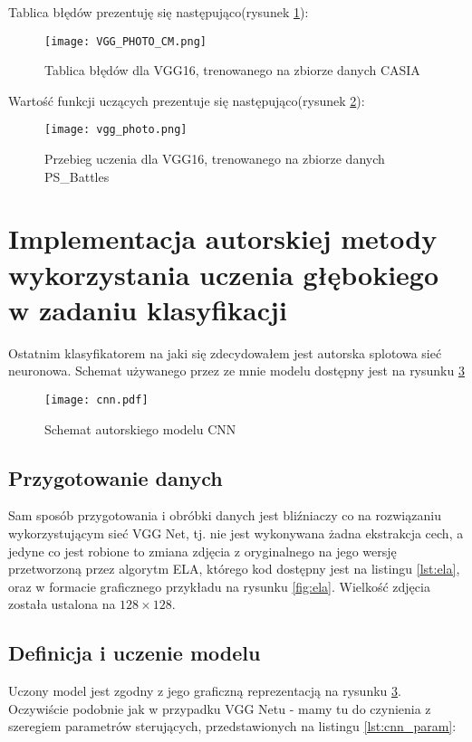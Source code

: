 Tablica błędów prezentuję się następująco(rysunek \ref{fig:vgg_cm_ps}):

\begin{figure}[H]
	\texttt{[image: VGG\_PHOTO\_CM.png]}
	\centering
	\caption{Tablica błędów dla VGG16, trenowanego na zbiorze danych CASIA}
	\label{fig:vgg_cm_ps}
\end{figure}

Wartość funkcji uczących prezentuje się następująco(rysunek \ref{fig:vgg_learn_photo}):

\begin{figure}[H]
	\texttt{[image: vgg\_photo.png]}
	\centering
	\caption{Przebieg uczenia dla VGG16, trenowanego na zbiorze danych PS\_Battles}
	\label{fig:vgg_learn_photo}
\end{figure}

\section{Implementacja autorskiej metody wykorzystania uczenia głębokiego w zadaniu klasyfikacji}

Ostatnim klasyfikatorem na jaki się zdecydowałem jest autorska splotowa sieć neuronowa. Schemat używanego przez ze mnie modelu dostępny jest na rysunku \ref{fig:cnn}

\begin{figure}[h!]
	\texttt{[image: cnn.pdf]}
	\centering
	\caption{Schemat autorskiego modelu CNN}
	\label{fig:cnn}
\end{figure}

\subsection{Przygotowanie danych}

Sam sposób przygotowania i obróbki danych jest bliźniaczy co na rozwiązaniu wykorzystującym sieć VGG Net, tj. nie jest wykonywana żadna ekstrakcja cech, a jedyne co jest robione to zmiana zdjęcia z oryginalnego na jego wersję przetworzoną przez algorytm ELA, którego kod dostępny jest na listingu \ref{lst:ela}, oraz w formacie graficznego przykładu na rysunku \ref{fig:ela}. Wielkość zdjęcia została ustalona na $128 \times 128$.

\subsection{Definicja i uczenie modelu}

Uczony model jest zgodny z jego graficzną reprezentacją na rysunku \ref{fig:cnn}. Oczywiście podobnie jak w przypadku VGG Netu - mamy tu do czynienia z szeregiem parametrów sterujących, przedstawionych na listingu \ref{lst:cnn_param}:

